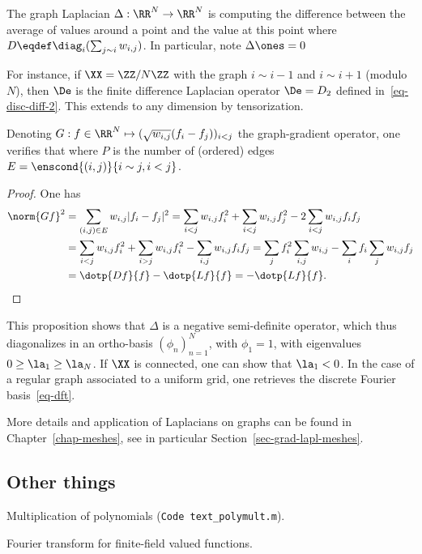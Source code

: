 The graph Laplacian $\Delta : \RR^N \rightarrow \RR^N$ is computing the difference between the average of values around a point and the value at this point
where $D \eqdef \diag_i(\sum_{j \sim i} w_{i,j})$. In particular, note $\Delta \ones=0$

For instance, if $\XX = \ZZ/N\ZZ$ with the graph $i \sim i-1$ and $i \sim i+1$ (modulo $N$), then $\De$ is the finite difference Laplacian operator $\De=D_2$ defined in~\eqref{eq-disc-diff-2}. This extends to any dimension by tensorization. 

\begin{prop}
Denoting $G : f \in \RR^N \mapsto ( \sqrt{w_{i,j}} (f_i-f_j) )_{i<j}$ the graph-gradient operator, one verifies that 
where $P$ is the number of (ordered) edges $E=\enscond{(i,j)}{i \sim j, i<j}$. 
\end{prop}
\begin{proof}
	One has 
	\begin{align*}
		\norm{Gf}^2 &= \sum_{(i,j) \in E} w_{i,j}|f_i-f_j|^2
				=\sum_{i<j}w_{i,j}f_i^2  + \sum_{i<j}w_{i,j}f_j^2 - 2 \sum_{i<j}w_{i,j}f_i f_j  \\
				&= \sum_{i<j}w_{i,j}f_i^2 + \sum_{i>j}w_{i,j}f_i^2- \sum_{i,j}w_{i,j}f_i f_j
				= \sum_j f_i^2 \sum_{i,j} w_{i,j} - \sum_if_i  \sum_j w_{i,j} f_j \\
				&= \dotp{Df}{f}-\dotp{Lf}{f}=-\dotp{Lf}{f}.
	\end{align*}
\end{proof}

This proposition shows that $\Delta$ is a negative semi-definite operator, which thus diagonalizes in an ortho-basis $(\phi_n)_{n=1}^N$, with $\phi_1=1$, with eigenvalues $0 \geq \la_1 \geq \la_N$. If $\XX$ is connected, one can show that $\la_1 <0$. In the case of a regular graph associated to a uniform grid, one retrieves the discrete Fourier basis~\eqref{eq-dft}. 

More details and application of Laplacians on graphs can be found in Chapter~\ref{chap-meshes}, see in particular Section~\ref{sec-grad-lapl-meshes}.



\subsection{Other things}

Multiplication of polynomials (\texttt{Code text\_polymult.m}).

Fourier transform for finite-field valued functions.




